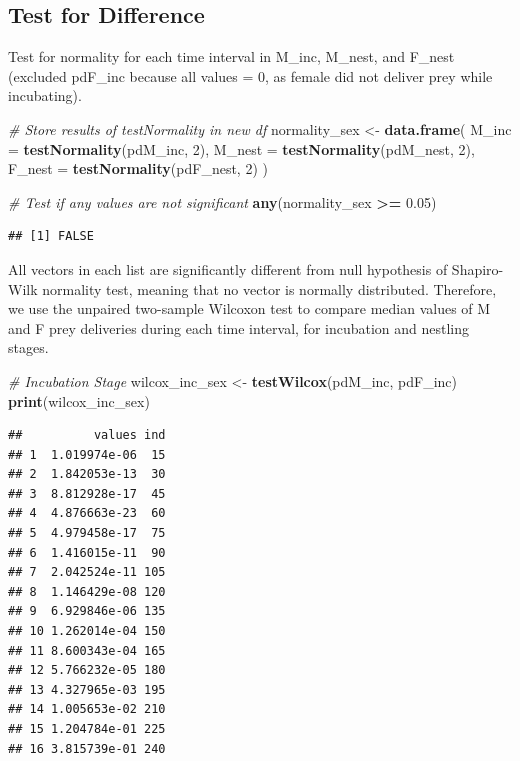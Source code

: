 \documentclass[]{article}
\newenvironment{Shaded}{\begin{snugshade}}{\end{snugshade}}
\newcommand{\CommentTok}[1]{\textcolor[rgb]{0.56,0.35,0.01}{\textit{#1}}}
\newcommand{\DataTypeTok}[1]{\textcolor[rgb]{0.13,0.29,0.53}{#1}}
\newcommand{\DecValTok}[1]{\textcolor[rgb]{0.00,0.00,0.81}{#1}}
\newcommand{\FloatTok}[1]{\textcolor[rgb]{0.00,0.00,0.81}{#1}}
\newcommand{\KeywordTok}[1]{\textcolor[rgb]{0.13,0.29,0.53}{\textbf{#1}}}
\newcommand{\NormalTok}[1]{#1}
\newcommand{\OperatorTok}[1]{\textcolor[rgb]{0.81,0.36,0.00}{\textbf{#1}}}
\newcommand{\StringTok}[1]{\textcolor[rgb]{0.31,0.60,0.02}{#1}}
\begin{document}
\hypertarget{test-for-difference}{%
\subsection{Test for Difference}\label{test-for-difference}}

Test for normality for each time interval in M\_inc, M\_nest, and
F\_nest (excluded pdF\_inc because all values = 0, as female did not
deliver prey while incubating).

\begin{Shaded}
\begin{Highlighting}[]
\CommentTok{# Store results of testNormality in new df}
\NormalTok{normality_sex <-}\StringTok{ }\KeywordTok{data.frame}\NormalTok{(}
  \DataTypeTok{M_inc =} \KeywordTok{testNormality}\NormalTok{(pdM_inc, }\DecValTok{2}\NormalTok{), }
  \DataTypeTok{M_nest =} \KeywordTok{testNormality}\NormalTok{(pdM_nest, }\DecValTok{2}\NormalTok{), }
  \DataTypeTok{F_nest =} \KeywordTok{testNormality}\NormalTok{(pdF_nest, }\DecValTok{2}\NormalTok{)}
\NormalTok{  )}

\CommentTok{# Test if any values are not significant}
\KeywordTok{any}\NormalTok{(normality_sex }\OperatorTok{>=}\StringTok{ }\FloatTok{0.05}\NormalTok{)}
\end{Highlighting}
\end{Shaded}

\begin{verbatim}
## [1] FALSE
\end{verbatim}

All vectors in each list are significantly different from null
hypothesis of Shapiro-Wilk normality test, meaning that no vector is
normally distributed. Therefore, we use the unpaired two-sample Wilcoxon
test to compare median values of M and F prey deliveries during each
time interval, for incubation and nestling stages.

\begin{Shaded}
\begin{Highlighting}[]
\CommentTok{# Incubation Stage}
\NormalTok{wilcox_inc_sex <-}\StringTok{ }\KeywordTok{testWilcox}\NormalTok{(pdM_inc, pdF_inc)}
\KeywordTok{print}\NormalTok{(wilcox_inc_sex)}
\end{Highlighting}
\end{Shaded}

\begin{verbatim}
##          values ind
## 1  1.019974e-06  15
## 2  1.842053e-13  30
## 3  8.812928e-17  45
## 4  4.876663e-23  60
## 5  4.979458e-17  75
## 6  1.416015e-11  90
## 7  2.042524e-11 105
## 8  1.146429e-08 120
## 9  6.929846e-06 135
## 10 1.262014e-04 150
## 11 8.600343e-04 165
## 12 5.766232e-05 180
## 13 4.327965e-03 195
## 14 1.005653e-02 210
## 15 1.204784e-01 225
## 16 3.815739e-01 240
\end{verbatim}
\end{document}
